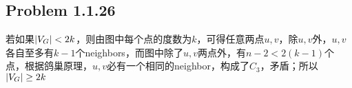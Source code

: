 \subsection*{Problem 1.1.26}
若如果$\left\lvert V_G \right\rvert < 2k$，则由图中每个点的度数为$k$，可得任意两点$u,v$，除$u,v$外，$u,v$各自至多有$k - 1$个neighbors，而图中除了$u,v$两点外，有$n - 2 < 2 (k - 1)$个点，根据鸽巢原理，$u,v$必有一个相同的neighbor，构成了$C_3$，矛盾；所以$\left\lvert V_G \right\rvert \geq 2k$

